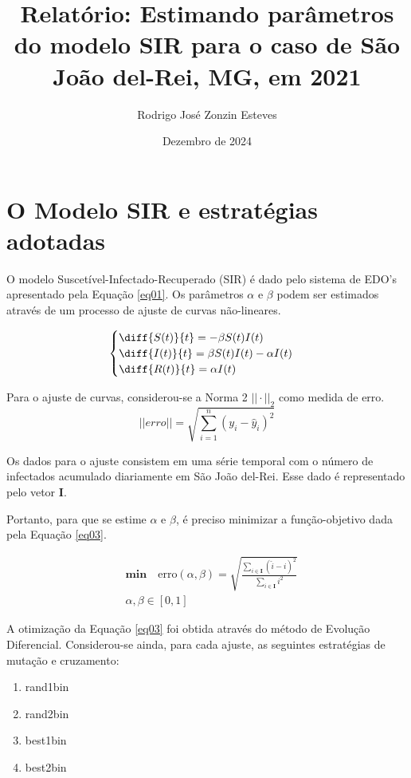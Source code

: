 \documentclass[]{article}
\title{Relatório: Estimando parâmetros do modelo SIR para o caso de São João del-Rei, MG, em 2021}
\author{Rodrigo José Zonzin Esteves}
\date{Dezembro de 2024}
\begin{document}
\maketitle

\section{O Modelo SIR e estratégias adotadas}
O modelo Suscetível-Infectado-Recuperado (SIR) é dado pelo sistema de EDO's apresentado pela Equação \ref{eq01}. Os parâmetros $\alpha$ e $\beta$ podem ser estimados através de um processo de ajuste de curvas não-lineares. 

\begin{equation}	
	\begin{cases}
		
		\diff{S(t)}{t} = -\beta S(t) I(t) \\
		\diff{I(t)}{t} = \beta S(t)  I(t) - \alpha I(t) \\
		\diff{R(t)}{t} = \alpha I(t)
	\end{cases}	
	\label{eq01}
\end{equation}

Para o ajuste de curvas, considerou-se a Norma 2 $||\cdot||_2$ como medida de erro. 
\begin{equation}
	||erro|| = \sqrt{\sum_{i = 1}^{n} (y_i - \hat{y}_i)^2}
\end{equation}

Os dados para o ajuste consistem em uma série temporal  com o número de infectados acumulado diariamente em São João del-Rei. Esse dado é representado pelo vetor $\mathbf{I}$. 

Portanto, para que se estime $\alpha$ e $\beta$, é preciso minimizar a função-objetivo dada pela Equação \ref{eq03}. 

\begin{equation}
	\begin{aligned}
		&\textbf{min} \quad \text{erro}(\alpha, \beta) = \sqrt{\frac{\sum_{i \in \mathbf{I}} (\hat{i} - i)^2}{\sum_{i \in \mathbf{I}} i^2}} \\
		&\alpha, \beta \in [0, 1]
	\end{aligned}
	\label{eq03}
\end{equation}


A otimização da Equação \ref{eq03} foi obtida através do método de Evolução Diferencial. Considerou-se ainda, para cada ajuste, as seguintes estratégias de mutação e cruzamento: 
\begin{enumerate}
	\item rand1bin
	\item rand2bin
	\item best1bin
	\item best2bin
\end{enumerate}
\end{document}
